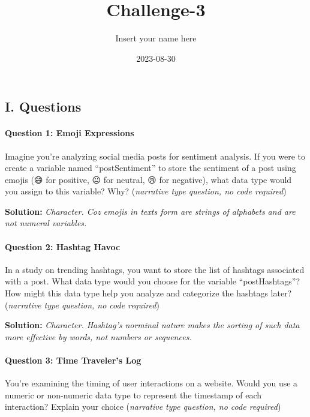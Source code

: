 \documentclass[
]{article}
\title{Challenge-3}
\author{Insert your name here}
\date{2023-08-30}
\begin{document}
\maketitle

\hypertarget{i.-questions}{%
\subsection{I. Questions}\label{i.-questions}}

\hypertarget{question-1-emoji-expressions}{%
\paragraph{Question 1: Emoji
Expressions}\label{question-1-emoji-expressions}}

Imagine you're analyzing social media posts for sentiment analysis. If
you were to create a variable named ``postSentiment'' to store the
sentiment of a post using emojis (😄 for positive, 😐 for neutral, 😢
for negative), what data type would you assign to this variable? Why?
(\emph{narrative type question, no code required})

\textbf{Solution:} \emph{Character. Coz emojis in texts form are strings
of alphabets and are not numeral variables.}

\hypertarget{question-2-hashtag-havoc}{%
\paragraph{Question 2: Hashtag Havoc}\label{question-2-hashtag-havoc}}

In a study on trending hashtags, you want to store the list of hashtags
associated with a post. What data type would you choose for the variable
``postHashtags''? How might this data type help you analyze and
categorize the hashtags later? (\emph{narrative type question, no code
required})

\textbf{Solution:} \emph{Character. Hashtag's norminal nature makes the
sorting of such data more effective by words, not numbers or sequences.}

\hypertarget{question-3-time-travelers-log}{%
\paragraph{Question 3: Time Traveler's
Log}\label{question-3-time-travelers-log}}

You're examining the timing of user interactions on a website. Would you
use a numeric or non-numeric data type to represent the timestamp of
each interaction? Explain your choice (\emph{narrative type question, no
code required})
\end{document}
